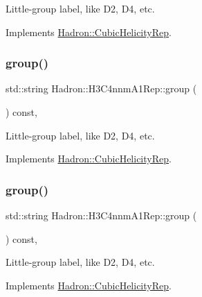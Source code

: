 Little-\/group label, like D2, D4, etc. 

Implements \mbox{\hyperlink{structHadron_1_1CubicHelicityRep_a101a7d76cd8ccdad0f272db44b766113}{Hadron\+::\+Cubic\+Helicity\+Rep}}.

\mbox{\label{structHadron_1_1H3C4nnmA1Rep_a90bcfd4f15d29f444a79b1dcd8198ea5}} 
\subsubsection{\texorpdfstring{group()}{group()}\hspace{0.1cm}{\footnotesize\ttfamily [3/5]}}
{\footnotesize\ttfamily std\+::string Hadron\+::\+H3\+C4nnm\+A1\+Rep\+::group (\begin{DoxyParamCaption}{ }\end{DoxyParamCaption}) const\hspace{0.3cm}{\ttfamily [inline]}, {\ttfamily [virtual]}}

Little-\/group label, like D2, D4, etc. 

Implements \mbox{\hyperlink{structHadron_1_1CubicHelicityRep_a101a7d76cd8ccdad0f272db44b766113}{Hadron\+::\+Cubic\+Helicity\+Rep}}.

\mbox{\label{structHadron_1_1H3C4nnmA1Rep_a90bcfd4f15d29f444a79b1dcd8198ea5}} 
\subsubsection{\texorpdfstring{group()}{group()}\hspace{0.1cm}{\footnotesize\ttfamily [4/5]}}
{\footnotesize\ttfamily std\+::string Hadron\+::\+H3\+C4nnm\+A1\+Rep\+::group (\begin{DoxyParamCaption}{ }\end{DoxyParamCaption}) const\hspace{0.3cm}{\ttfamily [inline]}, {\ttfamily [virtual]}}

Little-\/group label, like D2, D4, etc. 

Implements \mbox{\hyperlink{structHadron_1_1CubicHelicityRep_a101a7d76cd8ccdad0f272db44b766113}{Hadron\+::\+Cubic\+Helicity\+Rep}}.

